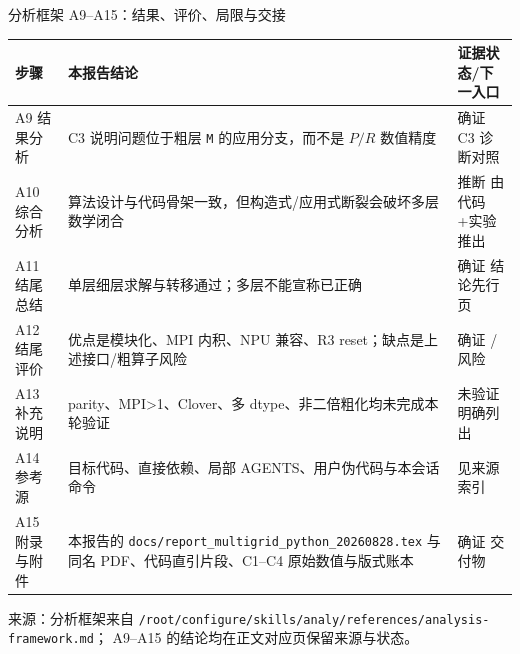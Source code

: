 \documentclass[UTF8,aspectratio=169,11pt]{ctexbeamer}
\newcommand{\source}[1]{%
  \vspace{0.06em}\par{\raggedright\scriptsize\color{muted}来源：#1\par}}
\newcommand{\pathref}[1]{\nolinkurl{#1}}
\newcommand{\verified}{\textcolor{evidence}{确证}}
\newcommand{\inferred}{\textcolor{accent}{推断}}
\newcommand{\unverified}{\textcolor{warn}{未验证}}
\newcommand{\risk}{\textcolor{warn}{风险}}
\begin{document}
\begin{frame}[t]{分析框架 A9--A15：结果、评价、局限与交接}
  \begin{center}
    \scriptsize
    \begin{tabular}{@{}P{0.12\textwidth}P{0.62\textwidth}P{0.20\textwidth}@{}}
      \toprule
      步骤 & 本报告结论 & 证据状态/下一入口 \\
      \midrule
      A9 结果分析 & C3 说明问题位于粗层 \texttt{M} 的应用分支，而不是 $P/R$ 数值精度 & \verified{} C3 诊断对照 \\
      A10 综合分析 & 算法设计与代码骨架一致，但构造式/应用式断裂会破坏多层数学闭合 & \inferred{} 由代码+实验推出 \\
      A11 结尾总结 & 单层细层求解与转移通过；多层不能宣称已正确 & \verified{} 结论先行页 \\
      A12 结尾评价 & 优点是模块化、MPI 内积、NPU 兼容、R3 reset；缺点是上述接口/粗算子风险 & \verified{} / \risk{} \\
      A13 补充说明 & parity、MPI>1、Clover、多 dtype、非二倍粗化均未完成本轮验证 & \unverified{} 明确列出 \\
      A14 参考源 & 目标代码、直接依赖、局部 AGENTS、用户伪代码与本会话命令 & 见来源索引 \\
      A15 附录与附件 & 本报告的 \pathref{docs/report_multigrid_python_20260828.tex} 与同名 PDF、代码直引片段、C1--C4 原始数值与版式账本 & \verified{} 交付物 \\
      \bottomrule
    \end{tabular}
  \end{center}
  \source{分析框架来自 \pathref{/root/configure/skills/analy/references/analysis-framework.md}；
  A9--A15 的结论均在正文对应页保留来源与状态。}
\end{frame}
\end{document}

